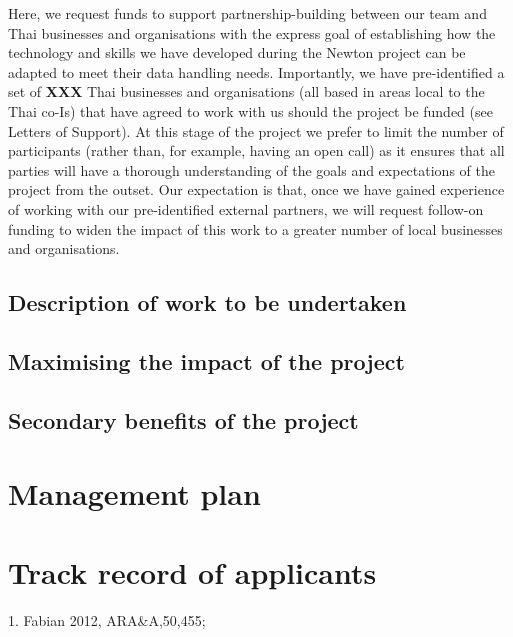 \documentclass[11pt]{article}
\begin{document}
\vspace{2mm}
\noindent
Here, we request funds to support partnership-building between our team and Thai businesses and organisations with the express goal of establishing how the technology and skills we have developed during the Newton project can be adapted to meet their data handling needs. Importantly, we have pre-identified a set of {\bf XXX} Thai businesses and organisations (all based in areas local to the Thai co-Is) that have agreed to work with us should the project be funded (see Letters of Support). At this stage of the project we prefer to limit the number of participants (rather than, for example, having an open call) as it ensures that all parties will have a thorough understanding of the goals and expectations of the project from the outset. Our expectation is that, once we have gained experience of working with our pre-identified external partners, we will request follow-on funding to widen the impact of this work to a greater number of local businesses and organisations.


\subsection{Description of work to be undertaken}

\subsection{Maximising the impact of the project}

\subsection{Secondary benefits of the project}

\section{Management plan}

\section{Track record of applicants}


\vspace{10mm}
 {\scriptsize 1. Fabian 2012,
  ARA\&A,50,455;
}
\end{document}
